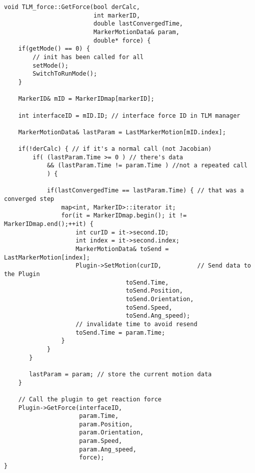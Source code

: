 {
\scriptsize
\begin{verbatim}
void TLM_force::GetForce(bool derCalc,
                         int markerID,
                         double lastConvergedTime,
                         MarkerMotionData& param,
                         double* force) {
    if(getMode() == 0) {
        // init has been called for all
        setMode();
        SwitchToRunMode();
    }

    MarkerID& mID = MarkerIDmap[markerID];

    int interfaceID = mID.ID; // interface force ID in TLM manager

    MarkerMotionData& lastParam = LastMarkerMotion[mID.index];

    if(!derCalc) { // if it's a normal call (not Jacobian)
        if( (lastParam.Time >= 0 ) // there's data
            && (lastParam.Time != param.Time ) //not a repeated call
            ) {
	
            if(lastConvergedTime == lastParam.Time) { // that was a converged step
                map<int, MarkerID>::iterator it;
                for(it = MarkerIDmap.begin(); it != MarkerIDmap.end();++it) {
                    int curID = it->second.ID;
                    int index = it->second.index;
                    MarkerMotionData& toSend = LastMarkerMotion[index];
                    Plugin->SetMotion(curID,          // Send data to the Plugin
                                  toSend.Time,
                                  toSend.Position,
                                  toSend.Orientation,
                                  toSend.Speed,
                                  toSend.Ang_speed);
                    // invalidate time to avoid resend
                    toSend.Time = param.Time;
                }
            }
       }

       lastParam = param; // store the current motion data
    }

    // Call the plugin to get reaction force
    Plugin->GetForce(interfaceID,
                     param.Time,
                     param.Position,
                     param.Orientation,
                     param.Speed,
                     param.Ang_speed,
                     force);
}

\end{verbatim}
}



